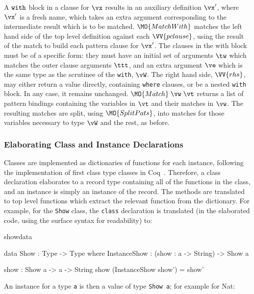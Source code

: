 A $\mathtt{with}$ block in a clause for $\vx$
results in an auxiliary definition $\vx'$, where $\vx'$ is a fresh name,
which takes an extra argument corresponding to the intermediate result which
is to be matched.
$\MO{MatchWith}$ matches the left hand side of the top level definition against
each $\VV{pclause}$, using the result of the match to build each pattern clause
for $\vx'$. 
The clauses in the with block must be of a specific form: they must have an initial
set of arguments $\tw$ which matches the outer clause arguments
$\ttt$, and an extra argument
$\ve$ which is the same type as the scrutinee of the \texttt{with}, $\vW$.
The right hand side, $\VV{rhs}$, may either return a value directly, containing 
\texttt{where} clauses, or be a nested \texttt{with} block. In any case, it
remains unchanged.
$\MO{Match}\;\vw\;\vt$ returns a list of pattern bindings containing
the variables in $\vt$ and their matches in $\vw$.
The resulting matches are split, using $\MO{SplitPats}$, into matches for those
variables necessary to type $\vW$ and the rest, as before.

\subsubsection{Elaborating Class and Instance Declarations}

Classes are implemented as dictionaries of functions for each instance,
following the implementation of first class type classes in Coq~\cite{Sozeau2008}.
Therefore, a class declaration elaborates to a record type containing all
of the functions in the class, and an instance is simply an instance of the
record. The methods are translated to top level functions which extract the
relevant function from the dictionary.  For example, for the \texttt{Show}
class, the \texttt{class} declaration is translated (in the elaborated code,
using the surface \Idris{} syntax for readability)
to:

\begin{SaveVerbatim}{showdata}

data Show : Type -> Type where
    InstanceShow : (show : a -> String) -> Show a

show : Show a -> a -> String
show (InstanceShow show') = show'

\end{SaveVerbatim}

\noindent
An instance for a type \texttt{a} is then a value of type \texttt{Show a}; for example for Nat:

